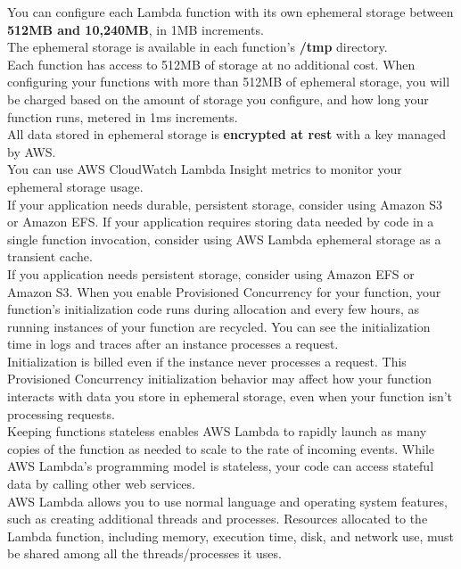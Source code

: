 \documentclass[12pt, letterpaper, twoside]{article}
\begin{document}
You can configure each Lambda function with its own ephemeral storage between \textbf{512MB and 10,240MB}, in 1MB increments.\\
The ephemeral storage is available in each function’s \textbf{/tmp} directory.\\
Each function has access to 512MB of storage at no additional cost. When configuring your functions with more than 512MB of ephemeral storage, 
you will be charged based on the amount of storage you configure, and how long your function runs, metered in 1ms increments.\\

All data stored in ephemeral storage is \textbf{encrypted at rest} with a key managed by AWS.\\

You can use AWS CloudWatch Lambda Insight metrics to monitor your ephemeral storage usage.\\

If your application needs durable, persistent storage, consider using Amazon S3 or Amazon EFS. If your application requires storing data 
needed by code in a single function invocation, consider using AWS Lambda ephemeral storage as a transient cache.\\

If you application needs persistent storage, consider using Amazon EFS or Amazon S3. When you enable Provisioned Concurrency for your 
function, your function's initialization code runs during allocation and every few hours, as running instances of your function are 
recycled. You can see the initialization time in logs and traces after an instance processes a request.\\
Initialization is billed even if the instance never processes a request. This Provisioned Concurrency initialization behavior may affect 
how your function interacts with data you store in ephemeral storage, even when your function isn’t processing requests.\\

Keeping functions stateless enables AWS Lambda to rapidly launch as many copies of the function as needed to scale to the rate of 
incoming events. While AWS Lambda’s programming model is stateless, your code can access stateful data by calling other web services.\\

AWS Lambda allows you to use normal language and operating system features, such as creating additional threads and processes.
Resources allocated to the Lambda function, including memory, execution time, disk, and network use, must be shared among all the 
threads/processes it uses.\\
\end{document}
